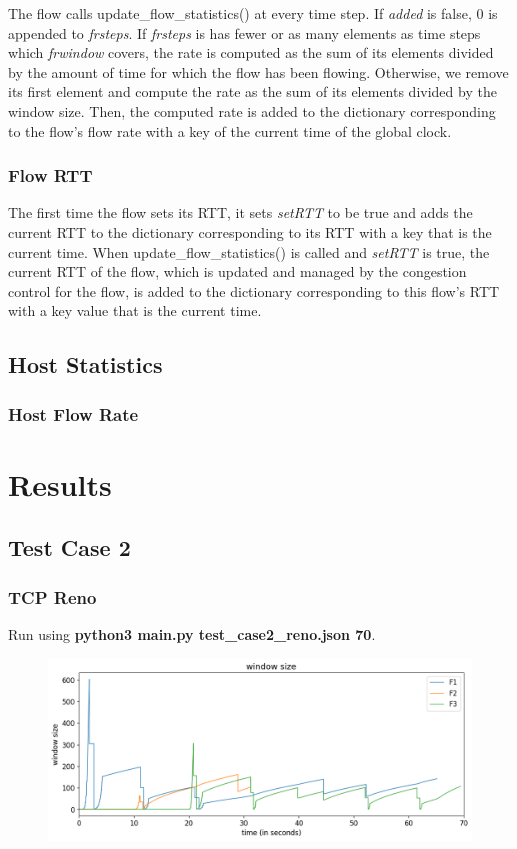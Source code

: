 \documentclass{article}
\begin{document}
The flow calls update\_flow\_statistics() at every time step. If {\em added} is false, 0  is appended to {\em frsteps}. If {\em frsteps} is has fewer or as many elements as time steps which {\em frwindow} covers, the rate is computed as the sum of its elements divided by the amount of time for which the flow has been flowing. Otherwise, we remove its first element and compute the rate as the sum of its elements divided by the window size. Then, the computed rate is added to the dictionary corresponding to the flow's flow rate with a key of the current time of the global clock.

\subsubsection{Flow RTT}
The first time the flow sets its RTT, it sets {\em setRTT} to be true and adds the current RTT to the dictionary corresponding to its RTT with a key that is the current time. When update\_flow\_statistics() is called and {\em setRTT} is true, the current RTT of the flow, which is updated and managed by the congestion control for the flow, is added to the dictionary corresponding to this flow's RTT with a key value that is the current time. 

\subsection{Host Statistics}
\subsubsection{Host Flow Rate}


\section{Results}

\subsection{Test Case 2}

\subsubsection{TCP Reno}

Run using \textbf{python3 main.py test\_case2\_reno.json 70}.

\begin{figure}[H]
\centering
\includegraphics[width = \textwidth]{test_case2_reno window size.png}
\end{figure}
\end{document}
